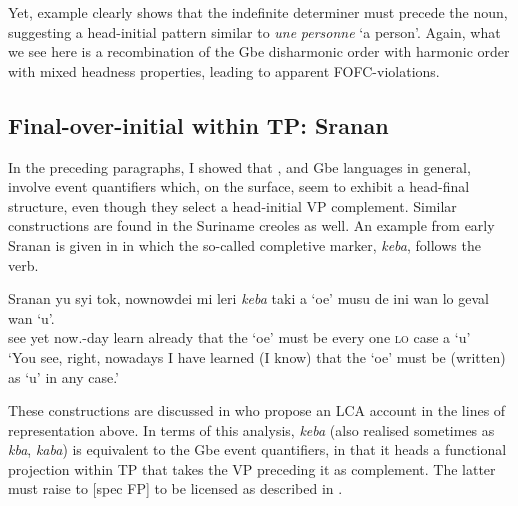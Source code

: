 \documentclass[output=paper]{langsci/langscibook}
\begin{document}
Yet, example  clearly shows that the indefinite determiner must
precede the noun, suggesting a head-initial pattern similar to 
\textit{une} \textit{personne} ‘a person’. Again, what we see here is a
recombination of the Gbe disharmonic order with  harmonic order with
mixed headness properties, leading to apparent FOFC-violations.

\subsection{Final-over-initial within TP: Sranan}

In the preceding paragraphs, I showed that , and Gbe languages in
general, involve event quantifiers which, on the surface, seem to exhibit a
head-final structure, even though they select a head-initial VP complement.
Similar constructions are found in the Suriname creoles as well. An example
from early Sranan is given in  in which the so-called completive
marker, \textit{keba}, follows the verb.

\ea\label{ex:aboh:14.14}Sranan
    \sn\gll yu syi tok, nownowdei mi leri \textit{keba} taki a \enquote*{oe} musu de ini wan lo geval wan \enquote*{u}. \\
            \Tsg{} see yet now.\Red{}-day \Fsg{} learn already that the \enquote*{oe} must be every one \textsc{lo} case a \enquote*{u} \\
    \glt    \textquoteleft{}You see, right, nowadays I have learned (I know)
            that the \enquote*{oe} must be (written) as \enquote*{u} in any
            case.\textquoteright{}
\z

These constructions are discussed in \citet{VandenBergAboh2013} who propose
an \gls{LCA} account in the lines of representation  above. In terms
of this analysis, \textit{keba} (also realised sometimes as \textit{kba},
\textit{kaba}) is equivalent to the Gbe event quantifiers, in that it heads a
functional projection within TP that takes the VP preceding it as complement.
The latter must raise to [spec FP] to be licensed as described in
.
\end{document}
